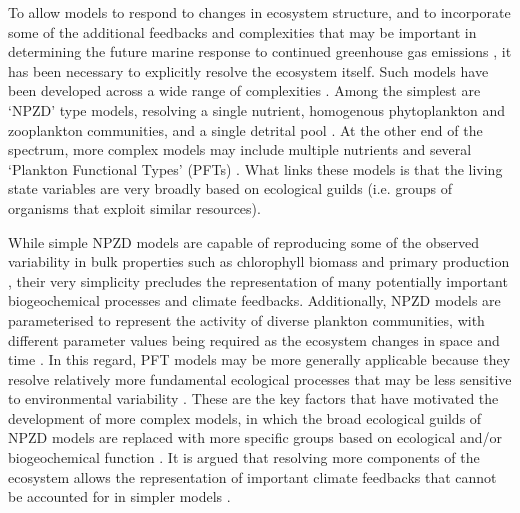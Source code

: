 \documentclass[gmd, manuscript]{copernicus}
\begin{document}
To allow models to respond to changes in ecosystem structure, and to incorporate some of the additional  feedbacks and complexities that may be important in determining the future marine response to continued greenhouse gas emissions \citep{LeQuere:2005}, it has been necessary to explicitly resolve the ecosystem itself. Such models have been developed across a wide range of complexities \citep{Kwiatkowski:2014}. Among the simplest are `NPZD' type models, resolving a single nutrient, homogenous  phytoplankton and zooplankton communities, and a single detrital pool \citep{Wroblewski:1988,Oschlies:2001}. At the other end of the spectrum, more complex models may include multiple nutrients and several `Plankton Functional Types' (PFTs) \citep[e.g.][]{Aumont:2003,Moore:2002,LeQuere:2005}. What links these models is that the living state variables are very broadly based on ecological guilds (i.e. groups of organisms that exploit similar resources). 

While simple NPZD models are capable of reproducing some of the observed variability in bulk properties such as chlorophyll biomass and primary production \citep{Schartau:2003pt2,Yool:2013a,Ward:2013a}, their very simplicity precludes the representation of many potentially important biogeochemical processes and climate feedbacks. Additionally, NPZD models are parameterised to represent the activity of diverse plankton communities, with different parameter values being required as the ecosystem changes in space and time \citep{Schartau:2003pt1,Losa:2006}. In this regard, PFT models may be more generally applicable because they resolve relatively more fundamental ecological processes that may be less sensitive to environmental variability \citep{Friedrichs:2007}. These are the key factors that have motivated the development of more complex models, in which the broad ecological guilds of NPZD models are replaced with more specific groups based on ecological and/or biogeochemical function \citep{Aumont:2015,Butenschon:2016}. It is argued that resolving more components of the ecosystem allows the representation of important climate feedbacks that cannot be accounted for in simpler models \citep{LeQuere:2006}. 
\end{document}
